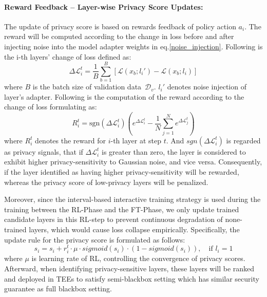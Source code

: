 \documentclass{article}
\begin{document}
\paragraph{ Reward Feedback -- Layer-wise Privacy Score Updates:}
The update of privacy score is based on rewards feedback of policy action $a_i$. The reward will be computed according to the change in loss before and after injecting noise into the model adapter weights in eq.\ref{noise_injection}. Following is the i-th layers' change of loss defined as:
\begin{equation}
    \Delta\mathcal{L}_i^t = \frac{1}{B}\sum_{b=1}^B \left[\mathcal{L}(x_b;l_i') -\mathcal{L}(x_b;l_i)\right]
\end{equation}
where $B$ is the batch size of validation data~$\mathcal{D}_v$. $l_i'$ denotes noise injection of layer's adapter. 
Following is the computation of the reward according to the change of loss formulating as: 
\begin{equation}
    R_i^t = \mathrm{sgn}(\Delta\mathcal{L}_i^t)\left(e^{\Delta\mathcal{L}_i^t} - \frac{1}{N}\sum^{N}_{j=1}e^{\Delta\mathcal{L}_j^t}\right)
\end{equation}
where $R_i^t$ denotes the reward for $i$-th layer at step $t$. And $sgn(\Delta\mathcal{L}_i^t)$ is regarded as privacy signals, that if $\Delta\mathcal{L}_i^t$ is greater than zero, the layer is considered to exhibit higher privacy-sensitivity to Gaussian noise, and vice versa. Consequently, if the layer identified as having higher privacy-sensitivity will be rewarded, whereas the privacy score of low-privacy layers will be penalized.

Moreover, since the interval-based interactive training strategy is used during the training between the RL-Phase and the FT-Phase, we only update trained candidate layers in this RL-step to prevent continuous degradation of none-trained layers, which would cause loss collapse empirically. Specifically, the update rule for the privacy score is formulated as follows:
\begin{equation}
s_i = s_i + r_i^t \cdot \mu \cdot sigmoid(s_i) \cdot (1 - sigmoid(s_i)), \quad \text{if  } l_i = 1
\end{equation}
where $\mu$ is learning rate of RL, controlling the convergence of privacy scores.
Afterward,  when identifying privacy-sensitive layers, these layers will be ranked and deployed in TEEs to satisfy semi-blackbox setting which has similar security guarantee as full blackbox setting.
\end{document}
